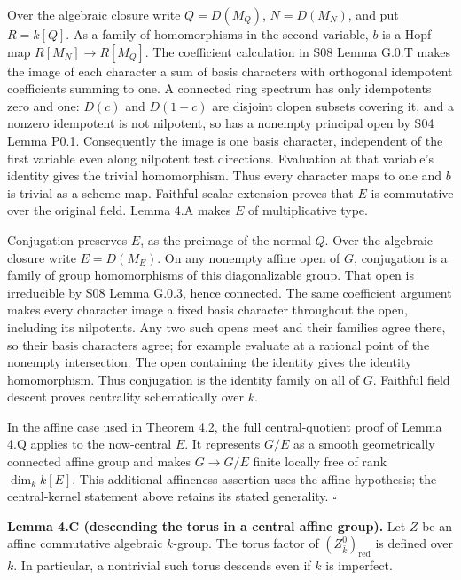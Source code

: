 \documentclass[11pt,a4paper,openany]{report}
\newcounter{none}
\begin{document}
Over the algebraic closure write \(Q=D(M_Q)\), \(N=D(M_N)\), and put \(R=k[Q]\). As a family of homomorphisms in the second variable, \(b\) is a Hopf map \(R[M_N]\to R[M_Q]\). The coefficient calculation in S08 Lemma G.0.T makes the image of each character a sum of basis characters with orthogonal idempotent coefficients summing to one. A connected ring spectrum has only idempotents zero and one: \(D(c)\) and \(D(1-c)\) are disjoint clopen subsets covering it, and a nonzero idempotent is not nilpotent, so has a nonempty principal open by S04 Lemma P0.1. Consequently the image is one basis character, independent of the first variable even along nilpotent test directions. Evaluation at that variable's identity gives the trivial homomorphism. Thus every character maps to one and \(b\) is trivial as a scheme map. Faithful scalar extension proves that \(E\) is commutative over the original field. Lemma 4.A makes \(E\) of multiplicative type.

Conjugation preserves \(E\), as the preimage of the normal \(Q\). Over the algebraic closure write \(E=D(M_E)\). On any nonempty affine open of \(G\), conjugation is a family of group homomorphisms of this diagonalizable group. That open is irreducible by S08 Lemma G.0.3, hence connected. The same coefficient argument makes every character image a fixed basis character throughout the open, including its nilpotents. Any two such opens meet and their families agree there, so their basis characters agree; for example evaluate at a rational point of the nonempty intersection. The open containing the identity gives the identity homomorphism. Thus conjugation is the identity family on all of \(G\). Faithful field descent proves centrality schematically over \(k\).

In the affine case used in Theorem 4.2, the full central-quotient proof of Lemma 4.Q applies to the now-central \(E\). It represents \(G/E\) as a smooth geometrically connected affine group and makes \(G\to G/E\) finite locally free of rank \(\dim_k k[E]\). This additional affineness assertion uses the affine hypothesis; the central-kernel statement above retains its stated generality. \(\square\)

\textbf{Lemma 4.C (descending the torus in a central affine group).} Let \(Z\) be an affine commutative algebraic \(k\)-group. The torus factor of \((Z_{\bar k}^0)_{\mathrm{red}}\) is defined over \(k\). In particular, a nontrivial such torus descends even if \(k\) is imperfect.
\end{document}
